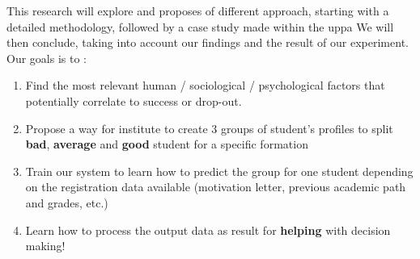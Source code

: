 \documentclass[../main.tex]{subfiles}
\begin{document}
This research will explore and proposes of different approach, starting with a detailed methodology, followed by a case study made within the \acrfull{uppa}
We will then conclude, taking into account our findings and the result of our experiment.
Our goals is to : 
\begin{enumerate}
    \item Find the most relevant human / sociological / psychological factors that potentially correlate to success or drop-out.
    \item Propose a way for institute to create 3 groups of student's profiles to split \textbf{bad}, \textbf{average} and \textbf{good} student for a specific formation
    \item Train our system to learn how to predict the group for one student depending on the registration data available (motivation letter, previous academic path and grades, etc.)
    \item Learn how to process the output data as result for \textbf{helping} with decision making!
\end{enumerate}
\end{document}
